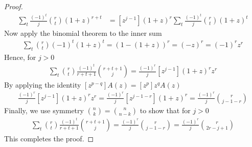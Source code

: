 \begin{lemma}
\begin{proof}
        \begin{align*}
            [z^{j-1}] \sum_t \frac{(-1)^t}{j} \binom{r}{t} (1+z)^{r+t}
            &= [z^{j-1}] (1+z)^r \sum_t \frac{(-1)^t}{j} \binom{r}{t} (1+z)^t
        \end{align*}
        Now apply the binomial theorem to the inner sum
        \begin{align*}
            \sum_t \binom{r}{t} (-1)^t (1+z)^t = \left(1 - (1+z)\right)^r = (-z)^r = (-1)^r z^r
        \end{align*}
        Hence, for $j>0$
        \begin{align*}
            \sum_t \binom{r}{t} \frac{(-1)^t}{r+t+1} \binom{r+t+1}{j} = \frac{(-1)^r}{j} [z^{j-1}] (1+z)^r z^r
        \end{align*}
        By applying the identity $[z^{p-q}]A(z)=[z^p]z^{q} A(z)$
        \begin{align*}
            \frac{(-1)^r}{j}  [z^{j-1}] (1+z)^r z^r = \frac{(-1)^r}{j}  [z^{j-1-r}] (1+z)^r = \frac{(-1)^r}{j} \binom{r}{j - 1 - r}
        \end{align*}
        Finally, we use symmetry $\binom{n}{k} = \binom{n}{n-k}$ to show that for $j > 0$
        \begin{align*}
            \sum_t \binom{r}{t} \frac{(-1)^t}{r+t+1} \binom{r+t+1}{j} = \frac{(-1)^r}{j} \binom{r}{j - 1 - r} = \frac{(-1)^r}{j} \binom{r}{2r - j + 1}
        \end{align*}
        This completes the proof.
    \end{proof}
\end{lemma}

